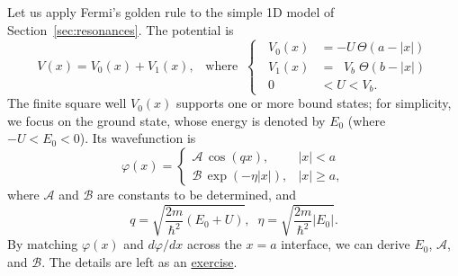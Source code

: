 \documentclass[pra,12pt]{revtex4}
\begin{document}
Let us apply Fermi's golden rule to the simple 1D model of
Section~\ref{sec:resonances}.  The potential is
\begin{equation}
  V(x) = V_0(x) + V_1(x), \;\;\;\mathrm{where}\;\;
  \left\{\;\;
  \begin{aligned}
    V_0(x) &= -U \, \Theta(a-|x|) \\
    V_1(x) &= \;\;V_b\; \Theta(b-|x|) \\
    0 &<U<V_b.
  \end{aligned}\right.
\end{equation}
The finite square well $V_0(x)$ supports one or more bound states; for
simplicity, we focus on the ground state, whose energy is denoted by
$E_0$ (where $-U < E_0 < 0$).  Its wavefunction is
\begin{equation}
  \varphi(x) = \begin{cases}\mathcal{A}\,\cos(qx), & |x| < a \\
    \mathcal{B} \, \exp\left(-\eta|x|\right), & |x| \ge a,\end{cases}
  \label{varphiansatz0}
\end{equation}
where $\mathcal{A}$ and $\mathcal{B}$ are constants to be determined,
and
\begin{equation}
  q = \sqrt{\frac{2m}{\hbar^2}(E_0+U)}, \;\; \eta = \sqrt{\frac{2m}{\hbar^2}|E_0|}.
\end{equation}
By matching $\varphi(x)$ and $d\varphi/dx$ across the $x=a$ interface,
we can derive $E_0$, $\mathcal{A}$, and $\mathcal{B}$.  The details
are left as an \hyperref[ex:1dfgr]{exercise}.
\end{document}
